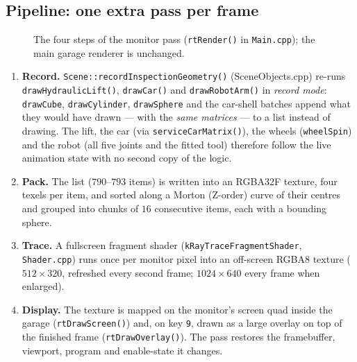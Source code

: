\documentclass[10pt,a4paper]{article}
\newcommand{\fn}[1]{\texttt{#1}}
\begin{document}
\subsection{Pipeline: one extra pass per frame}
\begin{figure}[!htbp]\centering
\resizebox{0.98\textwidth}{!}{}
\caption{The four steps of the monitor pass (\fn{rtRender()} in \fn{Main.cpp}); the main garage renderer is unchanged.}\label{fig:rtpipe}
\end{figure}
\begin{enumerate}[leftmargin=*,label=\textbf{\arabic*.}]
\item \textbf{Record.} \fn{Scene::recordInspectionGeometry()} (SceneObjects.cpp) re-runs \fn{drawHydraulicLift()}, \fn{drawCar()} and
\fn{drawRobotArm()} in \emph{record mode}: \fn{drawCube}, \fn{drawCylinder}, \fn{drawSphere} and the car-shell batches append what they would have drawn --- with the \emph{same
matrices} --- to a list instead of drawing. The lift, the car (via \fn{serviceCarMatrix()}), the wheels (\fn{wheelSpin}) and the robot (all five joints and the fitted tool) therefore follow the live animation state with no second copy of the logic.
\item \textbf{Pack.} The list ($790$--$793$ items) is written into an RGBA32F texture, four texels per item, and sorted along a Morton (Z-order) curve of their centres and grouped into chunks of $16$ consecutive items, each with a bounding sphere.
\item \textbf{Trace.} A fullscreen fragment shader (\fn{kRayTraceFragmentShader}, \fn{Shader.cpp}) runs once per monitor pixel into an off-screen RGBA8 texture ($512{\times}320$, refreshed every second frame; $1024{\times}640$ every frame when enlarged).
\item \textbf{Display.} The texture is mapped on the monitor's screen quad inside the garage (\fn{rtDrawScreen()}) and, on key \fn{9}, drawn as a large overlay on top of the finished frame (\fn{rtDrawOverlay()}). The pass restores the framebuffer, viewport, program and enable-state it changes.
\end{enumerate}
\end{document}
